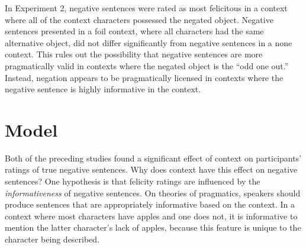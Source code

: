 \documentclass[10pt,letterpaper]{article}
\begin{document}
In Experiment 2, negative sentences were rated as most felicitous in  a context where all of the context characters possessed the negated object.  Negative sentences presented in a foil context, where all characters had the same alternative object, did not differ significantly from negative sentences in a none context.  This rules out the possibility that negative sentences are more pragmatically valid in contexts where the negated object is the ``odd one out.''  Instead, negation appears to be pragmatically licensed in contexts where the negative sentence is highly informative in the context.  

\section{Model}

Both of the preceding studies found a significant effect of context on participants' ratings of true negative sentences.  Why does context have this effect on negative sentences?  One hypothesis is that felicity ratings are influenced by the \emph{informativeness} of negative sentences. On theories of pragmatics, speakers should produce sentences that are appropriately informative based on the context.  In a context where most characters have apples and one does not, it is informative to mention the latter character's lack of apples, because this feature is unique to the character being described.



\end{document}
